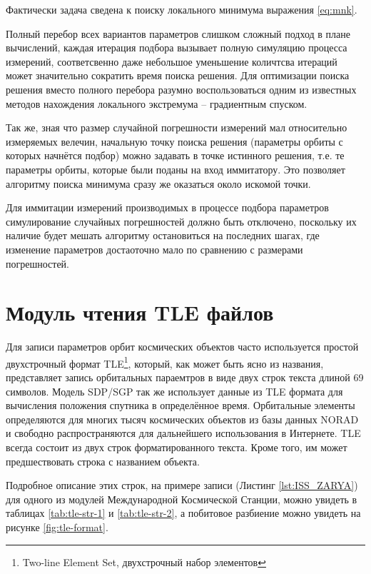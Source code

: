 Фактически задача сведена к поиску локального минимума выражения \ref{eq:mnk}.

Полный перебор всех вариантов параметров слишком сложный подход в плане вычислений, каждая итерация
подбора вызывает полную симуляцию процесса измерений, соответсвенно даже небольшое уменьшение количтсва итераций
может значительно сократить время поиска решения. Для оптимизации поиска решения вместо полного 
перебора разумно воспользоваться одним из известных методов нахождения локального 
экстремума -- градиентным спуском. 

Так же, зная что размер случайной погрешности измерений мал относительно 
измеряемых велечин, начальную точку поиска решения (параметры орбиты с которых начнётся подбор) 
можно задавать в точке истинного решения, т.е. те параметры орбиты, которые были поданы на вход иммитатору. 
Это позволяет алгоритму поиска минимума сразу же оказаться около искомой точки.

Для иммитации измерений производимых в процессе подбора параметров симулирование случайных погрешностей должно быть
отключено, поскольку их наличие будет мешать алгоритму остановиться на последних шагах, где изменение параметров 
достаоточно мало по сравнению с размерами погрешностей.

\section{Модуль чтения TLE файлов}

Для записи параметров орбит космических объектов часто используется простой двухстрочный формат 
TLE\footnote{Two-line Element Set, двухстрочный набор элементов}, который, как может быть ясно из названия, 
представляет запись орбитальных параемтров в виде двух строк текста длиной 69 символов. Модель SDP/SGP\cite{Norad}
так же использует данные из TLE формата для вычисления положения спутника в определённое время. Орбитальные элементы
определяются для многих тысяч космических объектов из базы данных NORAD и свободно распространяются для дальнейшего
использования в Интернете. TLE всегда состоит из двух строк форматированного текста. Кроме того, им может
предшествовать строка с названием объекта.

Подробное описание этих строк, на примере записи (Листинг \ref{lst:ISS_ZARYA}) для одного из модулей Международной
Космической Станции, можно увидеть в таблицах \ref{tab:tle-str-1} и \ref{tab:tle-str-2}, а побитовое разбиение
можно увидеть на рисунке \ref{fig:tle-format}.

